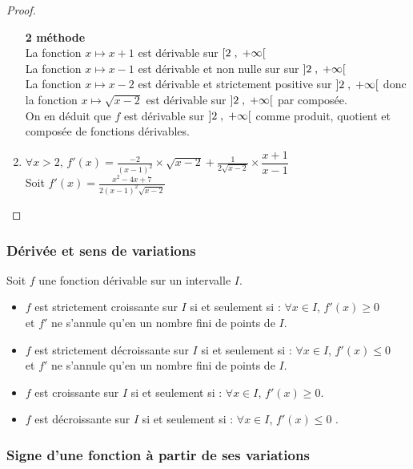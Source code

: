 \begin{example}
\begin{proof}
\begin{enumerate}
\textbf{ 2\iere{} méthode } \\  La fonction $ x \mapsto x+1 $ est  dérivable sur $\left[2 \;,\; +\infty\right[ $ \\ La fonction $ x \mapsto x-1 $ est  dérivable et non nulle  sur sur $\left]2 \;,\; +\infty\right[ $   \\ La fonction $ x \mapsto x-2$ est  dérivable et strictement positive sur $\left]2 \;,\; +\infty\right[$ donc la fonction $ x \mapsto \sqrt{x-2} $ est   dérivable sur $\left]2 \;,\; +\infty\right[$ par composée.\\ On en déduit que $ f $ est dérivable  sur $\left]2 \;,\; +\infty\right[$ comme produit, quotient et composée de  fonctions dérivables. 

 \item $ \forall x > 2  $, $ f'(x)= \frac{-2}{(x-1)^{2}}\times \sqrt{x-2}+ \frac{1}{2\sqrt{x-2}}\times \dfrac{x+1}{x-1} $\\
Soit  $ f'(x)=\frac{x^{2}-4x+7}{2(x-1)^{2}\sqrt{x-2}} $
\end{enumerate}
\end{proof}
\subsubsection*{Dérivée et sens de variations}
\begin{theorem}
Soit $ f $ une fonction dérivable sur un intervalle $ I. $
\begin{itemize}
\item[\textbullet] $f$ est strictement croissante sur $I$ si et seulement si : $ ∀ x\in I$, $f '(x) ≥ 0 $ \\et $f'$ ne s'annule qu'en un nombre fini de points de $I$. 
\item[\textbullet] $f$ est strictement décroissante sur $I$ si et seulement si : $ ∀ x\in I$, $f '(x)  \leq 0 $ \\ et $f'$ ne s'annule qu'en un nombre fini de points de $I$.
\item[\textbullet] $f$ est  croissante sur $I$ si et seulement si : $ ∀ x\in I$, $f '(x) ≥ 0 $. 
\item[\textbullet] $f$ est  décroissante sur $I$ si et seulement si : $ ∀ x\in I$, $f '(x) \leq 0 $ .  
\end{itemize}
\end{theorem}
 \subsubsection*{Signe d'une fonction à partir de ses variations}


\end{example}
